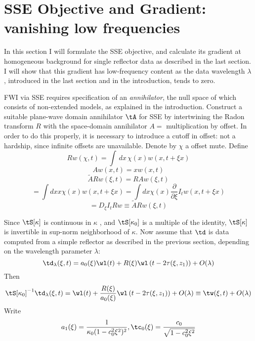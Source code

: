 




\section{SSE Objective and Gradient: vanishing low frequencies}
In this section I will formulate the SSE objective, and calculate its
gradient at homogeneous background for single reflector data as
described in the last section. I will show that this gradient has
low-frequency content as the data wavelength $\lambda$, introduced in
the last section and in the introduction, tends to zero. 

FWI via SSE requires specification of an {\em annihilator}, the null
space of which consists of non-extended models, as explained in the
introduction.  Construct a suitable plane-wave domain annihilator
$\tA$ for
SSE by intertwining the Radon transform $R$ with the space-domain
annihilator $A = $ multiplication by offset. In order to do this
properly, it is necessary to introduce a cutoff in offset: not a
hardship, since infinite offsets are unavailable. Denote by $\chi$ a
offset mute. Define
\[
Rw(\chi,t) = \int \,dx\,\chi(x) w(x,t+\xi x)
\]
\[
Aw(x,t)=x w(x,t)
\]
\[
\tilde{A} Rw (\xi,t) = R Aw (\xi,t)
\]
\[
=\int dx x \chi(x) w(x,t+\xi x) = \int dx \chi(x)\frac{\partial}{\partial \xi}
I_tw(x,t+\xi x)
\]
\[
= D_{\xi} I_t R  w \equiv \tilde{A} Rw (\xi,t) 
\]

Since $\tS[\kappa]$ is continuous in $\kappa$
\cite[]{BlazekStolkSymes:13}, and $\tS[\kappa_0]$ is a multiple of the
identity, $\tS[\kappa]$ is invertible in sup-norm neighborhood of
$\kappa$.
Now assume that $\td$ is data computed from a simple reflector as
described in the previous section, depending on the wavelength
parameter $\lambda$:
\[
\td_{\lambda}(\xi,t) = a_0(\xi)\wl(t) +
R(\xi)\wl\left(t-2\tau(\xi,z_1)\right) + O(\lambda)
\]
Then
\begin{equation}
\label{eqn:wtildedef}
\tS[\kappa_0]^{-1}\td_{\lambda}(\xi,t) = \wl(t) +
\frac{R(\xi)}{a_0(\xi)}\wl\left(t-2\tau(\xi,z_1)\right) + O(\lambda)
\equiv \tw(\xi,t) + O(\lambda)
\end{equation}
Write 
\[
a_1(\xi)=\frac{1}{\kappa_0 (1-c_0^2\xi^2)^2}, \tc_0(\xi) =
\frac{c_0}{\sqrt{1-c_0^2\xi^2}}
\]

